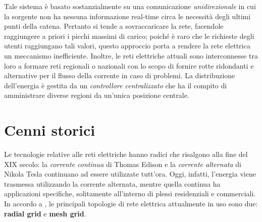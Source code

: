 \newline Tale sistema è basato sostanzialmente su una comunicazione \textit{unidirezionale} in cui la sorgente non ha nessuna informazione real-time circa le necessità degli ultimi punti della catena. Pertanto si tende a sovraccaricare la rete, facendole raggiungere a priori i picchi massimi di carico; poiché è raro che le richieste degli utenti raggiungano tali valori, questo approccio porta a rendere la rete elettrica un meccanismo inefficiente.
\newline
Inoltre, le reti elettriche attuali sono interconnesse tra loro a formare reti regionali o nazionali con lo scopo di fornire rotte ridondanti e alternative per il flusso della corrente in caso di problemi. \newline
La distribuzione dell'energia è gestita da un \textit{controllore centralizzato} che ha il compito di amministrare diverse regioni da un'unica posizione centrale. 

\section{Cenni storici}
Le tecnologie relative alle reti elettriche hanno radici che risalgono alla fine del XIX secolo: la \textit{corrente continua} di Thomas Edison e la \textit{corrente alternata} di Nikola Tesla continuano ad essere utilizzate tutt'ora. Oggi, infatti, l'energia viene trasmessa utilizzando la corrente alternata, mentre quella continua ha applicazioni specifiche, solitamente all'interno di plessi residenziali e commerciali. \newline \newline
In accordo a \cite{securingSG}, le principali topologie di rete elettrica attualmente in uso sono due: \textbf{radial grid} e \textbf{mesh grid}.


